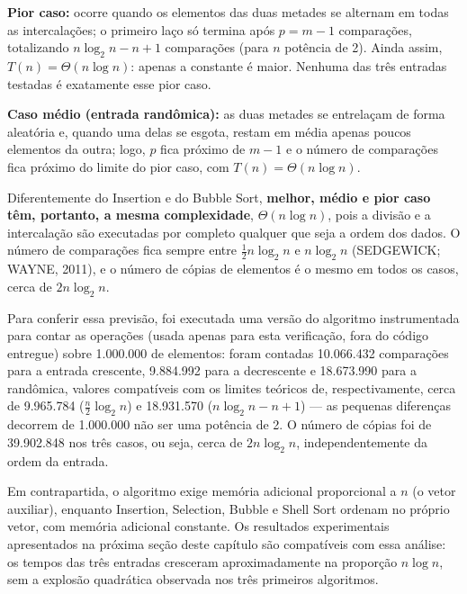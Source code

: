 \qquad \textbf{Pior caso:} ocorre quando os elementos das duas metades se
alternam em todas as intercalações; o primeiro laço só termina após
$p = m - 1$ comparações, totalizando $n \log_2 n - n + 1$ comparações
(para $n$ potência de 2). Ainda assim, $T(n) = \Theta(n \log n)$: apenas a
constante é maior. Nenhuma das três entradas testadas é exatamente esse
pior caso.

\qquad \textbf{Caso médio (entrada randômica):} as duas metades se
entrelaçam de forma aleatória e, quando uma delas se esgota, restam em
média apenas poucos elementos da outra; logo, $p$ fica próximo de $m - 1$
e o número de comparações fica próximo do limite do pior caso, com
$T(n) = \Theta(n \log n)$.

\qquad Diferentemente do Insertion e do Bubble Sort,
\textbf{melhor, médio e pior caso têm, portanto, a mesma complexidade},
$\Theta(n \log n)$, pois a divisão e a intercalação são executadas por
completo qualquer que seja a ordem dos dados. O número de comparações
fica sempre entre $\tfrac{1}{2} n \log_2 n$ e $n \log_2 n$
(SEDGEWICK; WAYNE, 2011), e o número de cópias de elementos é o mesmo em
todos os casos, cerca de $2n\log_2 n$.

\qquad Para conferir essa previsão, foi executada uma versão do algoritmo
instrumentada para contar as operações (usada apenas para esta
verificação, fora do código entregue) sobre 1.000.000 de elementos:
foram contadas 10.066.432 comparações para a entrada crescente,
9.884.992 para a decrescente e 18.673.990 para a randômica, valores
compatíveis com os limites teóricos de, respectivamente, cerca de
9.965.784 ($\tfrac{n}{2}\log_2 n$) e 18.931.570 ($n \log_2 n - n + 1$) --- as
pequenas diferenças decorrem de 1.000.000 não ser uma potência de 2.
O número de cópias foi de 39.902.848 nos três casos, ou seja, cerca de
$2n\log_2 n$, independentemente da ordem da entrada.

\qquad Em contrapartida, o algoritmo exige memória adicional proporcional a
$n$ (o vetor auxiliar), enquanto Insertion, Selection, Bubble e Shell
Sort ordenam no próprio vetor, com memória adicional constante. Os
resultados experimentais apresentados na próxima seção deste capítulo
são compatíveis com essa análise: os tempos das três entradas cresceram
aproximadamente na proporção $n \log n$, sem a explosão quadrática
observada nos três primeiros algoritmos.
